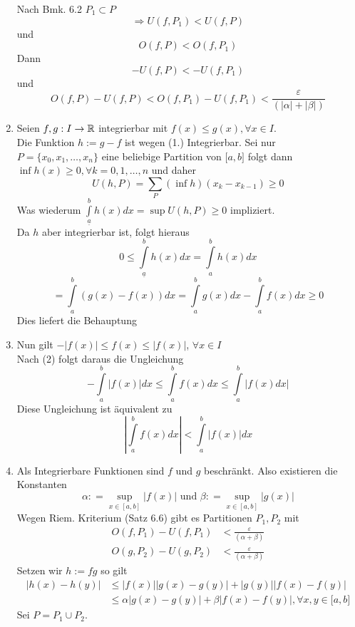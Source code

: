 \begin{enumerate}
Nach Bmk. 6.2 $P_1\subset P$
\[\Rightarrow U(f,P_1)<U(f,P)\] und \[O(f,P)<O(f,P_1)\]
Dann \[-U(f,P)<-U(f,P_1)\] und \[O(f,P)-U(f,P)<O(f,P_1)-U(f,P_1)<\frac{\varepsilon}{(\left| \alpha  \right| + \left| \beta  \right|)}\]

\item Seien $f,g:I\to\mathbb{R}$ integrierbar mit $f(x)\leq g(x), \forall x \in I$.\\
Die Funktion $h:=g-f$ ist wegen (1.) Integrierbar. Sei nur $P=\{x_0,x_1,\dots,x_n\}$ eine beliebige Partition von $\lbrack a,b\rbrack$ folgt dann $\inf h(x) \ge 0,\forall k = 0,1, \ldots ,n$ und daher \[U(h,P) = \sum\limits_P {(\inf h)({x_k} - {x_{k - 1}}) \ge 0} \]
Was wiederum $\int\limits_{\underline{a}}^b {h(x)dx = \sup U(h,P) \ge 0} $ impliziert. \\
Da $h$ aber integrierbar ist, folgt hieraus \[0 \le \int\limits_{\underline{a}}^b {h(x)dx = \int\limits_a^b {h(x)dx} } \]
\[ = \int\limits_a^b {(g(x) - f(x))dx = \int\limits_a^b {g(x)dx - \int\limits_a^b {f(x)dx} } }\geq 0 \]
Dies liefert die Behauptung
\item Nun gilt $ - \left| {f(x)} \right| \le f(x) \le \left| {f(x)} \right|$, $\forall x\in I$\\
Nach (2) folgt daraus die Ungleichung 
\[ - \int\limits_a^b {\left| {f(x)} \right|dx}  \le \int\limits_a^b {f(x)dx}  \le \int\limits_a^b {\left| {f(x)dx} \right|} \]
Diese Ungleichung ist äquivalent zu
\[\left| {\int\limits_a^b {f(x)dx} } \right| < \int\limits_a^b {\left| {f(x)} \right|dx} \]
\item Als Integrierbare Funktionen sind $f$ und $g$ beschränkt. Also existieren die Konstanten 
\[\alpha : = \mathop {\sup }\limits_{x \in [a,b]} \left| {f(x)} \right|{\text{ und }}\beta : = \mathop {\sup }\limits_{x \in [a,b]} \left| {g(x)} \right|\]
Wegen Riem. Kriterium (Satz 6.6) gibt es Partitionen $P_1,P_2$ mit
\begin{align*}
O(f,P_1)-U(f,P_1)&<\frac{\varepsilon}{(\alpha + \beta)}\\
 O(g,P_2)-U(g,P_2)&<\frac{\varepsilon}{(\alpha + \beta)}
\end{align*}
Setzen wir $h:=fg$ so gilt
\begin{align*}
\left| {h(x) - h(y)} \right| &\le \left| {f(x)} \right|\left| {g(x) - g(y)} \right| + \left| {g(y)} \right|\left| {f(x) - f(y)} \right|\\
 &\le \alpha \left| {g(x) - g(y)} \right| + \beta \left| {f(x) - f(y)} \right|, \forall x,y\in \lbrack a,b\rbrack
\end{align*}
Sei $P=P_1\cup P_2$.\\

\end{enumerate}
